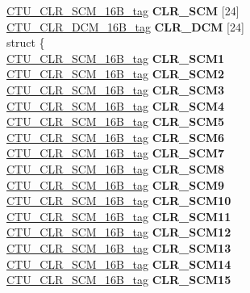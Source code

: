 \begin{DoxyCompactItemize}
\begin{tabbing}
\>\mbox{\hyperlink{unionCTU__CLR__SCM__16B__tag}{CTU\_CLR\_SCM\_16B\_tag}} {\bfseries CLR\_SCM} \mbox{[}24\mbox{]}\\
\>\mbox{\hyperlink{unionCTU__CLR__DCM__16B__tag}{CTU\_CLR\_DCM\_16B\_tag}} {\bfseries CLR\_DCM} \mbox{[}24\mbox{]}\\
\mbox{\label{unionCTU__struct__tag_1_1_0D1894_ad54df48ec0d9bfbe7c7ca9ee8aa9b447}} 
\>struct \{\\
\>\>\mbox{\hyperlink{unionCTU__CLR__SCM__16B__tag}{CTU\_CLR\_SCM\_16B\_tag}} {\bfseries CLR\_SCM1}\\
\>\>\mbox{\hyperlink{unionCTU__CLR__SCM__16B__tag}{CTU\_CLR\_SCM\_16B\_tag}} {\bfseries CLR\_SCM2}\\
\>\>\mbox{\hyperlink{unionCTU__CLR__SCM__16B__tag}{CTU\_CLR\_SCM\_16B\_tag}} {\bfseries CLR\_SCM3}\\
\>\>\mbox{\hyperlink{unionCTU__CLR__SCM__16B__tag}{CTU\_CLR\_SCM\_16B\_tag}} {\bfseries CLR\_SCM4}\\
\>\>\mbox{\hyperlink{unionCTU__CLR__SCM__16B__tag}{CTU\_CLR\_SCM\_16B\_tag}} {\bfseries CLR\_SCM5}\\
\>\>\mbox{\hyperlink{unionCTU__CLR__SCM__16B__tag}{CTU\_CLR\_SCM\_16B\_tag}} {\bfseries CLR\_SCM6}\\
\>\>\mbox{\hyperlink{unionCTU__CLR__SCM__16B__tag}{CTU\_CLR\_SCM\_16B\_tag}} {\bfseries CLR\_SCM7}\\
\>\>\mbox{\hyperlink{unionCTU__CLR__SCM__16B__tag}{CTU\_CLR\_SCM\_16B\_tag}} {\bfseries CLR\_SCM8}\\
\>\>\mbox{\hyperlink{unionCTU__CLR__SCM__16B__tag}{CTU\_CLR\_SCM\_16B\_tag}} {\bfseries CLR\_SCM9}\\
\>\>\mbox{\hyperlink{unionCTU__CLR__SCM__16B__tag}{CTU\_CLR\_SCM\_16B\_tag}} {\bfseries CLR\_SCM10}\\
\>\>\mbox{\hyperlink{unionCTU__CLR__SCM__16B__tag}{CTU\_CLR\_SCM\_16B\_tag}} {\bfseries CLR\_SCM11}\\
\>\>\mbox{\hyperlink{unionCTU__CLR__SCM__16B__tag}{CTU\_CLR\_SCM\_16B\_tag}} {\bfseries CLR\_SCM12}\\
\>\>\mbox{\hyperlink{unionCTU__CLR__SCM__16B__tag}{CTU\_CLR\_SCM\_16B\_tag}} {\bfseries CLR\_SCM13}\\
\>\>\mbox{\hyperlink{unionCTU__CLR__SCM__16B__tag}{CTU\_CLR\_SCM\_16B\_tag}} {\bfseries CLR\_SCM14}\\
\>\>\mbox{\hyperlink{unionCTU__CLR__SCM__16B__tag}{CTU\_CLR\_SCM\_16B\_tag}} {\bfseries CLR\_SCM15}\\

\end{tabbing}
\end{DoxyCompactItemize}
